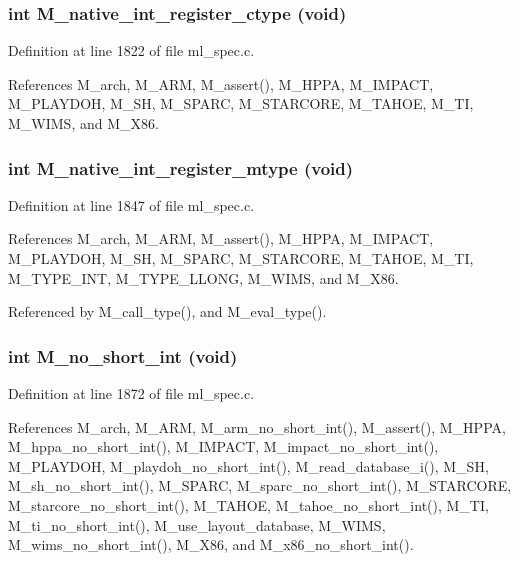 \subsubsection{\setlength{\rightskip}{0pt plus 5cm}int M\_\-native\_\-int\_\-register\_\-ctype (void)}\label{ml__spec_8c_8a083ae12702137e4e8eefe2e8204b54}




Definition at line 1822 of file ml\_\-spec.c.

References M\_\-arch, M\_\-ARM, M\_\-assert(), M\_\-HPPA, M\_\-IMPACT, M\_\-PLAYDOH, M\_\-SH, M\_\-SPARC, M\_\-STARCORE, M\_\-TAHOE, M\_\-TI, M\_\-WIMS, and M\_\-X86.
\subsubsection{\setlength{\rightskip}{0pt plus 5cm}int M\_\-native\_\-int\_\-register\_\-mtype (void)}\label{ml__spec_8c_eb08e74ba010028bb388755ca738cb02}




Definition at line 1847 of file ml\_\-spec.c.

References M\_\-arch, M\_\-ARM, M\_\-assert(), M\_\-HPPA, M\_\-IMPACT, M\_\-PLAYDOH, M\_\-SH, M\_\-SPARC, M\_\-STARCORE, M\_\-TAHOE, M\_\-TI, M\_\-TYPE\_\-INT, M\_\-TYPE\_\-LLONG, M\_\-WIMS, and M\_\-X86.

Referenced by M\_\-call\_\-type(), and M\_\-eval\_\-type().
\subsubsection{\setlength{\rightskip}{0pt plus 5cm}int M\_\-no\_\-short\_\-int (void)}\label{ml__spec_8c_e47c6528e171db653959e325ce869454}




Definition at line 1872 of file ml\_\-spec.c.

References M\_\-arch, M\_\-ARM, M\_\-arm\_\-no\_\-short\_\-int(), M\_\-assert(), M\_\-HPPA, M\_\-hppa\_\-no\_\-short\_\-int(), M\_\-IMPACT, M\_\-impact\_\-no\_\-short\_\-int(), M\_\-PLAYDOH, M\_\-playdoh\_\-no\_\-short\_\-int(), M\_\-read\_\-database\_\-i(), M\_\-SH, M\_\-sh\_\-no\_\-short\_\-int(), M\_\-SPARC, M\_\-sparc\_\-no\_\-short\_\-int(), M\_\-STARCORE, M\_\-starcore\_\-no\_\-short\_\-int(), M\_\-TAHOE, M\_\-tahoe\_\-no\_\-short\_\-int(), M\_\-TI, M\_\-ti\_\-no\_\-short\_\-int(), M\_\-use\_\-layout\_\-database, M\_\-WIMS, M\_\-wims\_\-no\_\-short\_\-int(), M\_\-X86, and M\_\-x86\_\-no\_\-short\_\-int().
